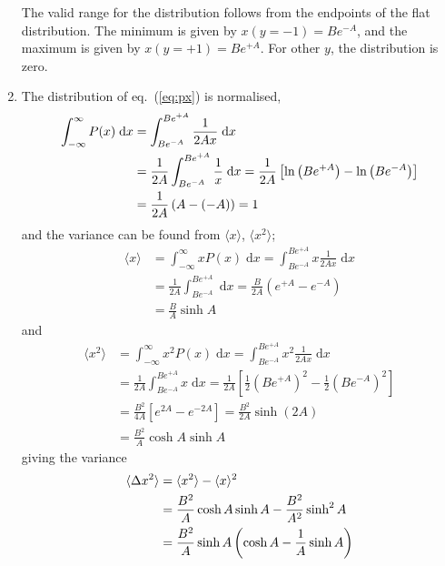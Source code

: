 \documentclass[a4paper,11pt]{article}
\newcommand{\diff}{\ensuremath{\; \text{d}}}
\begin{document}
\begin{enumerate}
        The valid range for the distribution follows from the endpoints of the flat distribution. The minimum is given by $x(y=-1) = Be^{-A}$, and the maximum is given by $x(y=+1) = Be^{+A}$. For other $y$, the distribution is zero.

    \item The distribution of eq.~(\ref{eq:px}) is normalised,
        \begin{align*}
            \int_{-\infty}^{\infty} P(x) \diff x &= \int_{Be^{-A}}^{Be^{+A}} \frac{1}{2Ax} \diff x \notag \\
            &=  \frac{1}{2A}\int_{Be^{-A}}^{Be^{+A}} \frac{1}{x} \diff x = \frac{1}{2A} \left[ \ln \left( Be^{+A} \right) - \ln \left( Be^{-A} \right) \right] \notag \\
            &=  \frac{1}{2A} \left( A - (-A) \right) = 1
        \end{align*}
        and the variance can be found from $\langle x \rangle$, $\langle x^2 \rangle$;
        \begin{align*}
            \langle x \rangle &= \int_{-\infty}^{\infty} x P(x) \diff x = \int_{Be^{-A}}^{Be^{+A}} x \frac{1}{2Ax} \diff x \\
            &=\frac{1}{2A}\int_{Be^{-A}}^{Be^{+A}} \diff x = \frac{B}{2A} \left( e^{+A} - e^{-A}  \right) \\
            &= \frac{B}{A} \sinh A
        \end{align*}
        and
        \begin{align*}
            \langle x^2 \rangle &= \int_{-\infty}^{\infty} x^2 P(x) \diff x = \int_{Be^{-A}}^{Be^{+A}} x^2 \frac{1}{2Ax} \diff x \\
            &=\frac{1}{2A}\int_{Be^{-A}}^{Be^{+A}} x \diff x = \frac{1}{2A} \left[ \frac{1}{2} (Be^{+A})^2 - \frac{1}{2}(Be^{-A})^2  \right] \\
            &= \frac{B^2}{4A} \left[ e^{2A} - e^{-2A} \right] = \frac{B^2}{2A} \sinh \left( 2A \right) \\
            &= \frac{B^2}{A} \cosh A \sinh A
        \end{align*}
        giving the variance 
        \begin{align}
        \langle \Delta x^2 \rangle &= \langle x^2 \rangle - \langle x \rangle^2 \notag \\
        &= \frac{B^2}{A} \cosh A \sinh A - \frac{B^2}{A^2} \sinh^2 A \notag \\
        &= \frac{B^2}{A} \sinh A \left( \cosh A - \frac{1}{A} \sinh A \right)
            \label{eq:var_1}
        \end{align}


\end{enumerate}
\end{document}
